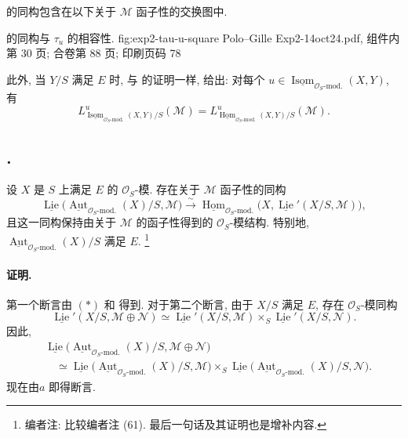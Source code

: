  的同构包含在以下关于 \(\mathcal M\)
函子性的交换图中.

  { 的同构与 \(\tau_u\) 的相容性.}
  {fig:exp2-tau-u-square}
  {Polo--Gille Exp2-14oct24.pdf, 组件内第 30 页; 合卷第 88 页; 印刷页码 78}

此外, 当 \(Y/S\) 满足 \(E\) 时, 与
 的证明一样,
 给出:
对每个 \(u\in\underline{\operatorname{Isom}}_{\mathcal O_S\text{-mod.}}(X,Y)\), 有
\begin{equation}
 L^u_{\underline{\operatorname{Isom}}_{\mathcal O_S\text{-mod.}}(X,Y)/S}
   (\mathcal M)
 =
 L^u_{\underline{\operatorname{Hom}}_{\mathcal O_S\text{-mod.}}(X,Y)/S}
   (\mathcal M).
 \tag{*}\label{sga3:ii:subsection:4-3:equation:isom-hom-lie-equality-star}
\end{equation}

\subsection*{.}
设 \(X\) 是 \(S\) 上满足 \(E\) 的 \(\mathcal O_S\)-模.
存在关于 \(\mathcal M\) 函子性的同构
\[
 \underline{\operatorname{Lie}}
  \bigl(\underline{\operatorname{Aut}}_{\mathcal O_S\text{-mod.}}(X)/S,
        \mathcal M\bigr)
 \xrightarrow{\sim}
 \underline{\operatorname{Hom}}_{\mathcal O_S\text{-mod.}}
  \bigl(X,\underline{\operatorname{Lie}}'(X/S,\mathcal M)\bigr),
\]
且这一同构保持由关于 \(\mathcal M\) 的函子性得到的 \(\mathcal O_S\)-模结构.
特别地, \(\underline{\operatorname{Aut}}_{\mathcal O_S\text{-mod.}}(X)/S\)
满足 \(E\).
\footnote{编者注: 比较编者注 (61). 最后一句话及其证明也是增补内容.}

\paragraph{证明.}
第一个断言由 \((*)\) 和  得到.
对于第二个断言, 由于 \(X/S\) 满足 \(E\), 存在 \(\mathcal O_S\)-模同构
\[
 \underline{\operatorname{Lie}}'(X/S,\mathcal M\oplus\mathcal N)
 \simeq
 \underline{\operatorname{Lie}}'(X/S,\mathcal M)
 \times_S
 \underline{\operatorname{Lie}}'(X/S,\mathcal N).
\]
因此,
\[
\begin{aligned}
 &\underline{\operatorname{Lie}}
  \bigl(\underline{\operatorname{Aut}}_{\mathcal O_S\text{-mod.}}(X)/S,
  \mathcal M\oplus\mathcal N\bigr)\\
 &\quad\simeq
 \underline{\operatorname{Lie}}
  \bigl(\underline{\operatorname{Aut}}_{\mathcal O_S\text{-mod.}}(X)/S,
  \mathcal M\bigr)
 \times_S
 \underline{\operatorname{Lie}}
  \bigl(\underline{\operatorname{Aut}}_{\mathcal O_S\text{-mod.}}(X)/S,
  \mathcal N\bigr).
\end{aligned}
\]
现在由\(a\) 即得断言.

